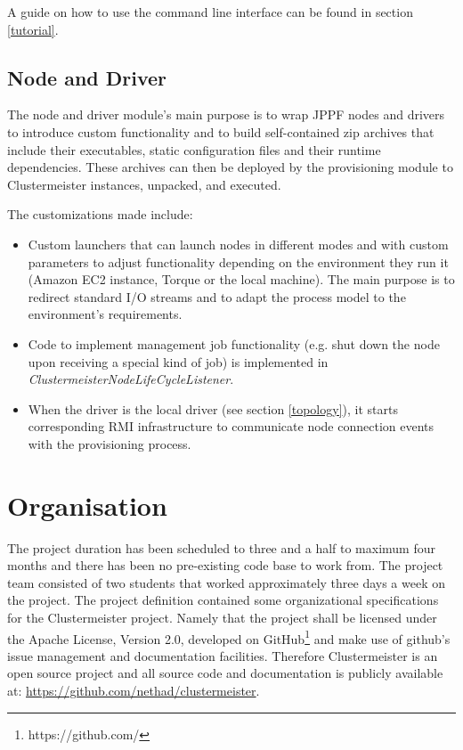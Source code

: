 \documentclass[english]{uzhpub}
\begin{document}
A guide on how to use the command line interface can be found in section \ref{tutorial}.

\subsection{Node and Driver}
The node and driver module's main purpose is to wrap JPPF nodes and drivers to introduce custom functionality and to build self-contained zip archives that include their executables, static configuration files and their runtime dependencies. These archives can then be deployed by the provisioning module to Clustermeister instances, unpacked, and executed.

The customizations made include:

\begin{itemize}
\item Custom launchers that can launch nodes in different modes and with custom parameters to adjust functionality depending on the environment they run it (Amazon EC2 instance, Torque or the local machine). The main purpose is to redirect standard I/O streams and to adapt the process model to the environment's requirements.
\item Code to implement management job functionality (e.g. shut down the node upon receiving a special kind of job) is implemented in \textit{ClustermeisterNodeLifeCycleListener}.
\item When the driver is the local driver (see section \ref{topology}), it starts corresponding RMI infrastructure to communicate node connection events with the provisioning process.
\end{itemize}

\section{Organisation}
\label{orga}
The project duration has been scheduled to three and a half to maximum four months and there has been no pre-existing code base to work from. The project team consisted of two students that worked approximately three days a week on the project. The project definition contained some organizational specifications for the Clustermeister project. Namely that the project shall be licensed under the Apache License, Version 2.0, developed on GitHub\footnote{https://github.com/} and make use of github's issue management and documentation facilities. Therefore Clustermeister is an open source project and all source code and documentation is publicly available at: \url{https://github.com/nethad/clustermeister}.
\end{document}
